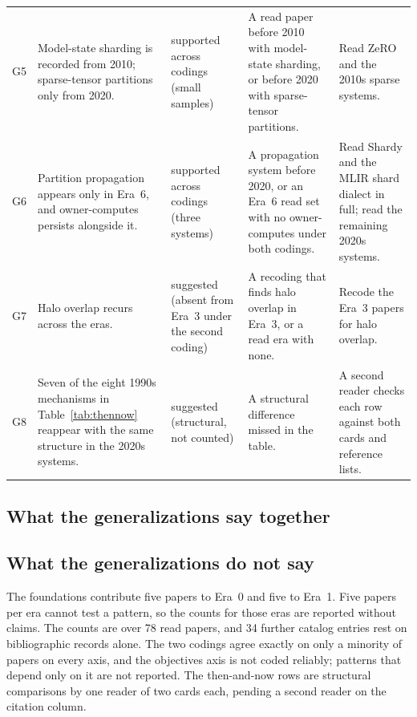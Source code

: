 \begin{table}[t]
\begin{tabular}{p{}p{}p{}p{}p{}}
G5 & Model-state sharding is recorded from 2010; sparse-tensor partitions only from 2020. & supported across codings (small samples) & A read paper before 2010 with model-state sharding, or before 2020 with sparse-tensor partitions. & Read ZeRO and the 2010s sparse systems. \\
G6 & Partition propagation appears only in Era~6, and owner-computes persists alongside it. & supported across codings (three systems) & A propagation system before 2020, or an Era~6 read set with no owner-computes under both codings. & Read Shardy and the MLIR shard dialect in full; read the remaining 2020s systems. \\
G7 & Halo overlap recurs across the eras. & suggested (absent from Era~3 under the second coding) & A recoding that finds halo overlap in Era~3, or a read era with none. & Recode the Era~3 papers for halo overlap. \\
G8 & Seven of the eight 1990s mechanisms in Table~\ref{tab:thennow} reappear with the same structure in the 2020s systems. & suggested (structural, not counted) & A structural difference missed in the table. & A second reader checks each row against both cards and reference lists. \\
\bottomrule
\end{tabular}
\end{table}

\subsection{What the generalizations say together}

\subsection{What the generalizations do not say}
The foundations contribute five papers to Era~0 and five to Era~1. Five papers per era cannot test a pattern, so the counts for those eras are reported without claims. The counts are over 78 read papers, and 34 further catalog entries rest on bibliographic records alone. The two codings agree exactly on only a minority of papers on every axis, and the objectives axis is not coded reliably; patterns that depend only on it are not reported. The then-and-now rows are structural comparisons by one reader of two cards each, pending a second reader on the citation column.

